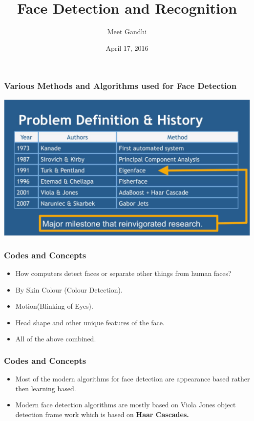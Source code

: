 \documentclass[•]{beamer}
\title{Face Detection and Recognition}
\author{Meet Gandhi}
\institute{IIT Gandhinagar}
\date{April 17, 2016}
\begin{document}
\begin{frame}
\titlepage
\end{frame}


\begin{frame}
\frametitle{Various Methods and Algorithms used for Face Detection}
\centering\includegraphics[scale=0.4]{Capture.PNG}
\end{frame}

\begin{frame}
\frametitle{Codes and Concepts}

\begin{itemize}%
\item<1->{How computers detect faces or separate other things from human faces?}\\
\item<2->{By Skin Colour (Colour Detection).}\\
\item<3->{Motion(Blinking of Eyes).}\\
\item<4->{Head shape and other unique features of the face.}\\
\item<5->{All of the above combined.}\\
\end{itemize}
\end{frame}

\begin{frame}
\frametitle{Codes and Concepts}
\begin{itemize}
\item<1->{Most of the modern algorithms for face detection are appearance based rather then learning based.}
\item<2->{Modern face detection algorithms are mostly based on Viola Jones object detection frame work which is based on \bf Haar Cascades.}
\end{itemize}
\end{frame}
\end{document}
